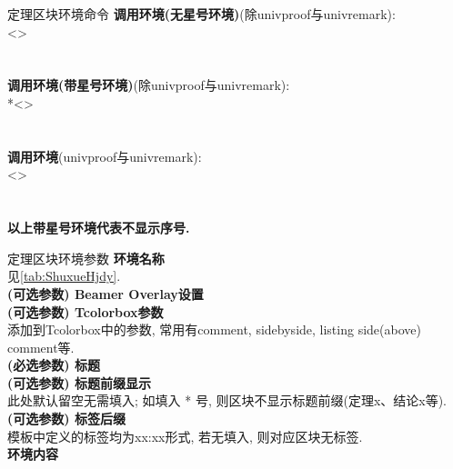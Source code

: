 \documentclass[hyperref, UTF8, CJK, aspectratio=169]{beamer}
\begin{document}
\begin{frame}{定理区块环境命令}
	\textbf{调用环境(无星号环境)}(除univproof与univremark):\\
	\textcolor{univgrey}{<>}\textcolor{univgrey}{}\\
	\hspace*{1em}\\
	\\[1ex]
	\textbf{调用环境(带星号环境)}(除univproof与univremark):\\
	*\textcolor{univgrey}{<>}\textcolor{univgrey}{}\\
	\hspace*{1em}\\
	\\[1ex]
	\textbf{调用环境}(univproof与univremark):\\
	\textcolor{univgrey}{<>}\\
	\hspace*{1em}\\
	\\[1ex]
	\textbf{以上带星号环境代表不显示序号.}
\end{frame}

\begin{frame}{定理区块环境参数}
	\alert{}\hfill \textbf{环境名称}\\
	见\vref{tab:ShuxueHjdy}.\\
	
	\alert{}\hfill \textbf{(可选参数) Beamer Overlay设置}\\
	
	\alert{}\hfill \textbf{(可选参数) Tcolorbox参数}\\
	添加到Tcolorbox中的参数, 常用有comment, sidebyside, listing side(above) comment等.\\
	
	\alert{}\hfill \textbf{(必选参数) 标题}\\
	
	\alert{}\hfill \textbf{(可选参数) 标题前缀显示}\\
	此处默认留空无需填入; 如填入 * 号, 则区块不显示标题前缀(定理x、结论x等).\\	
	
	\alert{}\hfill \textbf{(可选参数) 标签后缀}\\
	模板中定义的标签均为xx:xx形式, 若无填入, 则对应区块无标签.\\
		
	\alert{}\hfill \textbf{环境内容}
\end{frame}
\end{document}
